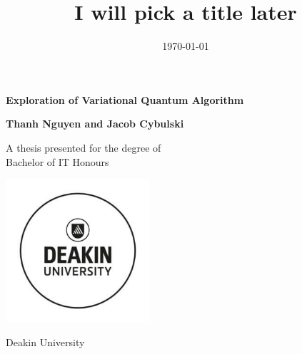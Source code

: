 \begin{titlepage}
    \begin{center}
        \vspace*{1cm}
            
        \Huge
        \textbf{Exploration of Variational Quantum Algorithm}
            
        \vspace{0.5cm}
        \LARGE
        \title{I will pick a title later}
        
            
        \vspace{1.5cm}
            
        \textbf{Thanh Nguyen and Jacob Cybulski}
            
        \vfill
            
        A thesis presented for the degree of\\
        Bachelor of IT Honours
            
        \vspace{0.8cm}
            
        \includegraphics[width=0.4\textwidth]{src/CoverPage/DeakinUniversityLogo.jpg}
        
            
        \Large
        Deakin University\\
        \date{\today}
            
    \end{center}
\end{titlepage}